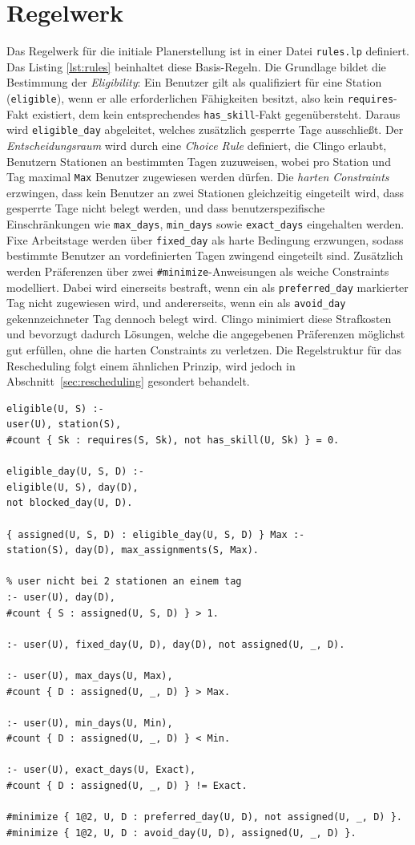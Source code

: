 \section{Regelwerk}
Das Regelwerk für die initiale Planerstellung ist in einer Datei \texttt{rules.lp} 
definiert. Das Listing \ref{lst:rules} beinhaltet diese Basis-Regeln. Die Grundlage bildet die Bestimmung der \textit{Eligibility}: Ein 
Benutzer gilt als qualifiziert für eine Station (\texttt{eligible}), wenn er 
alle erforderlichen Fähigkeiten besitzt, also kein \texttt{requires}-Fakt 
existiert, dem kein entsprechendes \texttt{has\_skill}-Fakt gegenübersteht. 
Daraus wird \texttt{eligible\_day} abgeleitet, welches zusätzlich gesperrte 
Tage ausschließt. Der \textit{Entscheidungsraum} wird durch eine \textit{Choice Rule} definiert, die Clingo erlaubt, Benutzern Stationen an bestimmten Tagen 
zuzuweisen, wobei pro Station und Tag maximal \texttt{Max} Benutzer zugewiesen 
werden dürfen. Die \textit{harten Constraints} erzwingen, dass kein Benutzer an 
zwei Stationen gleichzeitig eingeteilt wird, dass gesperrte Tage nicht belegt 
werden, und dass benutzerspezifische Einschränkungen wie \texttt{max\_days}, 
\texttt{min\_days} sowie \texttt{exact\_days} eingehalten werden. Fixe 
Arbeitstage werden über \texttt{fixed\_day} als harte Bedingung erzwungen, 
sodass bestimmte Benutzer an vordefinierten Tagen zwingend eingeteilt sind. 
Zusätzlich werden Präferenzen über zwei \texttt{\#minimize}-Anweisungen als weiche Constraints modelliert. Dabei wird einerseits bestraft, wenn ein als \texttt{preferred\_day} markierter Tag nicht zugewiesen wird, und andererseits, wenn ein als \texttt{avoid\_day} gekennzeichneter Tag dennoch belegt wird. Clingo minimiert diese Strafkosten und bevorzugt dadurch Lösungen, welche die angegebenen Präferenzen möglichst gut erfüllen, ohne die harten Constraints zu verletzen.
Die Regelstruktur für das Rescheduling folgt einem ähnlichen Prinzip, wird 
jedoch in Abschnitt~\ref{sec:rescheduling} gesondert behandelt.
\begin{lstlisting}[caption={ASP-Regeln},label={lst:rules}]
eligible(U, S) :-
user(U), station(S),
#count { Sk : requires(S, Sk), not has_skill(U, Sk) } = 0.

eligible_day(U, S, D) :-
eligible(U, S), day(D),
not blocked_day(U, D).

{ assigned(U, S, D) : eligible_day(U, S, D) } Max :-
station(S), day(D), max_assignments(S, Max).

% user nicht bei 2 stationen an einem tag
:- user(U), day(D),
#count { S : assigned(U, S, D) } > 1.

:- user(U), fixed_day(U, D), day(D), not assigned(U, _, D).

:- user(U), max_days(U, Max),
#count { D : assigned(U, _, D) } > Max.

:- user(U), min_days(U, Min),
#count { D : assigned(U, _, D) } < Min.

:- user(U), exact_days(U, Exact),
#count { D : assigned(U, _, D) } != Exact.

#minimize { 1@2, U, D : preferred_day(U, D), not assigned(U, _, D) }.
#minimize { 1@2, U, D : avoid_day(U, D), assigned(U, _, D) }.
\end{lstlisting}
